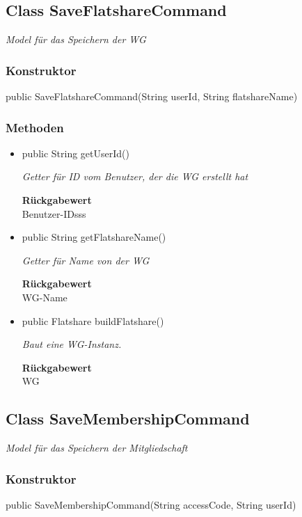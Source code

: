 \documentclass[a4paper]{scrreprt}
\begin{document}
        \subsection{Class SaveFlatshareCommand}
        \textit{Model für das Speichern der WG}
        \subsubsection{Konstruktor}
        public SaveFlatshareCommand(String userId, String flatshareName)
        \subsubsection{Methoden}
        \begin{itemize}
        	\item{public String getUserId()}
        	
        	\textit{Getter für ID vom Benutzer, der die WG erstellt hat}
        	
        	
        	
        	\textbf{Rückgabewert} \\
        	Benutzer-IDsss        \item{public String getFlatshareName()}
        	
        	\textit{Getter für Name von der WG}
        	
        	
        	
        	\textbf{Rückgabewert} \\
        	WG-Name        \item{public Flatshare buildFlatshare()}
        	
        	\textit{Baut eine WG-Instanz.}
        	
        	
        	
        	\textbf{Rückgabewert} \\
        	WG
        \end{itemize}
        \subsection{Class SaveMembershipCommand}
        \textit{Model für das Speichern der Mitgliedschaft}
        \subsubsection{Konstruktor}
        public SaveMembershipCommand(String accessCode, String userId)
\end{document}
